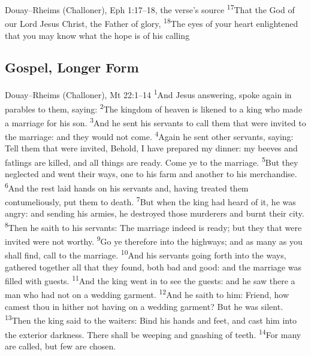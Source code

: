\begin{englishwitness}{Douay--Rheims (Challoner), Eph 1:17--18, the verse's source}
\textsuperscript{17}That the God of our Lord Jesus Christ, the Father of glory,
 \textsuperscript{18}The eyes of your heart enlightened that
you may know what the hope is of his calling 
\end{englishwitness}

\subsection{Gospel, Longer Form}
\label{proper-gospel-long}


\begin{englishwitness}{Douay--Rheims (Challoner), Mt 22:1--14}
\textsuperscript{1}And Jesus answering, spoke again in parables to them,
saying: \textsuperscript{2}The kingdom of heaven is likened to a king who made
a marriage for his son. \textsuperscript{3}And he sent his servants to call them
that were invited to the marriage: and they would not come.
\textsuperscript{4}Again he sent other servants, saying: Tell them that were
invited, Behold, I have prepared my dinner: my beeves and fatlings are killed,
and all things are ready. Come ye to the marriage. \textsuperscript{5}But they
neglected and went their ways, one to his farm and another to his merchandise.
\textsuperscript{6}And the rest laid hands on his servants and, having treated
them contumeliously, put them to death. \textsuperscript{7}But when the king
had heard of it, he was angry: and sending his armies, he destroyed those
murderers and burnt their city. \textsuperscript{8}Then he saith to his
servants: The marriage indeed is ready; but they that were invited were not
worthy. \textsuperscript{9}Go ye therefore into the highways; and as many as
you shall find, call to the marriage. \textsuperscript{10}And his servants
going forth into the ways, gathered together all that they found, both bad and
good: and the marriage was filled with guests. \textsuperscript{11}And the king
went in to see the guests: and he saw there a man who had not on a wedding
garment. \textsuperscript{12}And he saith to him: Friend, how camest thou in
hither not having on a wedding garment? But he was silent.
\textsuperscript{13}Then the king said to the waiters: Bind his hands and feet,
and cast him into the exterior darkness. There shall be weeping and gnashing of
teeth. \textsuperscript{14}For many are called, but few are chosen.
\end{englishwitness}

